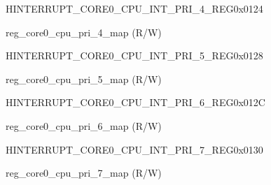 \begin{register}{H}{INTERRUPT\_CORE0\_CPU\_INT\_PRI\_4\_REG}{0x0124}\label{regdesc:INTERRUPTCORE0CPUINTPRI4REG}
%
%
\regnewline%
\begin{regdesc}\begin{reglist}
\label{fielddesc:INTERRUPTCORE0CPUPRI4MAP}\item [INTERRUPT\_CORE0\_CPU\_PRI\_4\_MAP] reg\_core0\_cpu\_pri\_4\_map (R/W)
\end{reglist}\end{regdesc}
\end{register}


\begin{register}{H}{INTERRUPT\_CORE0\_CPU\_INT\_PRI\_5\_REG}{0x0128}\label{regdesc:INTERRUPTCORE0CPUINTPRI5REG}
%
%
\regnewline%
\begin{regdesc}\begin{reglist}
\label{fielddesc:INTERRUPTCORE0CPUPRI5MAP}\item [INTERRUPT\_CORE0\_CPU\_PRI\_5\_MAP] reg\_core0\_cpu\_pri\_5\_map (R/W)
\end{reglist}\end{regdesc}
\end{register}


\begin{register}{H}{INTERRUPT\_CORE0\_CPU\_INT\_PRI\_6\_REG}{0x012C}\label{regdesc:INTERRUPTCORE0CPUINTPRI6REG}
%
%
\regnewline%
\begin{regdesc}\begin{reglist}
\label{fielddesc:INTERRUPTCORE0CPUPRI6MAP}\item [INTERRUPT\_CORE0\_CPU\_PRI\_6\_MAP] reg\_core0\_cpu\_pri\_6\_map (R/W)
\end{reglist}\end{regdesc}
\end{register}


\begin{register}{H}{INTERRUPT\_CORE0\_CPU\_INT\_PRI\_7\_REG}{0x0130}\label{regdesc:INTERRUPTCORE0CPUINTPRI7REG}
%
%
\regnewline%
\begin{regdesc}\begin{reglist}
\label{fielddesc:INTERRUPTCORE0CPUPRI7MAP}\item [INTERRUPT\_CORE0\_CPU\_PRI\_7\_MAP] reg\_core0\_cpu\_pri\_7\_map (R/W)
\end{reglist}\end{regdesc}
\end{register}


